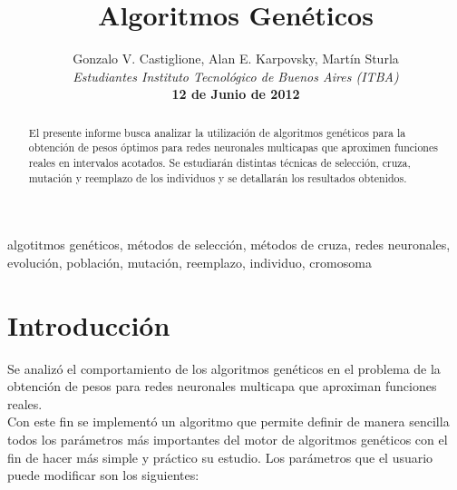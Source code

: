 \documentclass[%
    final,
    reprint,
    notitlepage,
    narroweqnarray,
    inline,
    twoside,
    invited
    ]{ieee}
\begin{document}
\title[Algoritmos Genéticos]{%
       Algoritmos Genéticos}

\author[Castiglione, Karpovsky, Sturla]{Gonzalo V. Castiglione, Alan E. Karpovsky, Martín Sturla\\\textit{Estudiantes 
       Instituto Tecnológico de Buenos Aires (ITBA)}\\
\textbf{12 de Junio de 2012}
}


\lognumber{}
\pubitemident{}


\maketitle               

\begin{abstract} 
El presente informe busca analizar la utilización de algoritmos genéticos 
para la obtención de pesos óptimos para
redes neuronales multicapas que aproximen funciones reales en intervalos acotados. 
Se estudiarán distintas técnicas de selección, cruza, mutación y reemplazo de los 
individuos y se detallarán los resultados obtenidos.
\end{abstract}

\begin{keywords}
algotitmos genéticos, métodos de selección, métodos de cruza, redes neuronales, evolución, población, mutación, reemplazo, individuo, cromosoma
\end{keywords}

\section{Introducción}

\par Se analizó el comportamiento de los algoritmos genéticos en el problema de la obtención de pesos para redes 
neuronales multicapa que aproximan funciones reales.\\
Con este fin se implementó un algoritmo que permite definir de manera sencilla todos 
los parámetros más importantes del motor de algoritmos genéticos con el fin de hacer más simple 
y práctico su estudio. Los parámetros que el usuario puede modificar son los siguientes:\\
\end{document}
